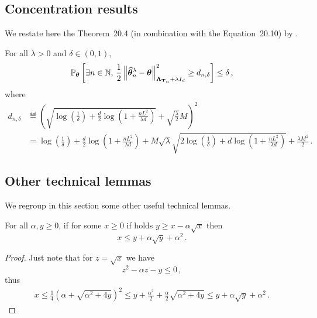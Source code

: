 \subsection{Concentration results}\label{app:lgc.lemmas.concentration}

We restate here the Theorem~20.4 (in combination with the Equation~20.10) by \citet{lattimore2018bandits}.
\begin{theorem}
\label{th:confidence_beta}
For all $\lambda >0$ and $\delta \in(0,1)$,
\[
    \mathbb{P}_{\boldsymbol \theta}\left[\exists n\in{\mathbb N},\, \frac{1}{2}\left\lVert\widehat{{\boldsymbol \theta}}_n^\lambda-{\boldsymbol \theta}\right\rVert^2_{{\boldsymbol \Lambda}_{{\bf T}_n}+\lambda I_d} \geq d_{n,\delta}\right] \leq \delta\,,
\]
where
\begin{align*}
    d_{n,\delta} &\eqdef  \left( \sqrt{\log\left( \frac{1}{\delta}\right)+\frac{d}{2}\log\left(1+\frac{n L^2}{\lambda d} \right)} +\sqrt{\frac{\lambda}{2}}M\right)^2\\
    &=\log\!\left( \frac{1}{\delta}\right)+\frac{d}{2}\log\left(1+\frac{n L^2}{\lambda d} \right) +  M\sqrt{\lambda}\sqrt{2\log\left( \frac{1}{\delta}\right)+d\log\!\left(1+\frac{n L^2}{\lambda d} \right)}+\frac{\lambda M^2}{2}\,.
\end{align*}
\end{theorem}

\subsection{Other technical lemmas}\label{app:lgc.lemmas.other}

We regroup in this section some other useful technical lemmas.

\begin{lemma}
\label{lem:inq_revert_sqrt}
For all $\alpha,y\geq 0$, if for some $x\geq 0$ if holds $y \geq x-\alpha\sqrt{x}$ then
\[
x \leq y + \alpha \sqrt{y} + \alpha^2\,.
\]
\end{lemma}
\begin{proof}
Just note that for $z=\sqrt{x}$ we have
\[
z^2-\alpha z -y \leq 0\,,
\]
thus
\begin{align*}
  x \leq \frac{1}{4}\left(\alpha +\sqrt{\alpha^2+4y}\right)^2
  \leq y +\frac{\alpha^2}{2}+\frac{\alpha}{2}\sqrt{\alpha^2+4y}
  \leq y +\alpha\sqrt{y}+\alpha^2\,.
\end{align*}
\end{proof}

